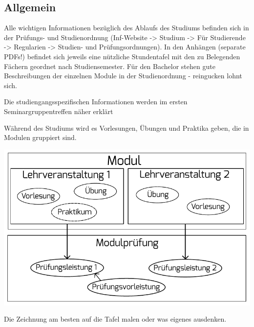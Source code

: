 \documentclass[a4paper,12pt]{report}
\begin{document}
\subsection{Allgemein}
\begin{itemize*}
	\item Alle wichtigen Informationen bezüglich des Ablaufs des Studiums befinden sich in der Prüfungs- und Studienordnung (Inf-Website -> Studium -> Für Studierende -> Regularien -> Studien- und Prüfungsordnungen).
	In den Anhängen (separate PDFs!) befindet sich jeweils eine nützliche Stundentafel mit den zu Belegenden Fächern geordnet nach Studiensemester.
	Für den Bachelor stehen gute Beschreibungen der einzelnen Module in der Studienordnung - reingucken lohnt sich.
	\item Die studiengangsspezifischen Informationen werden im ersten Seminargruppentreffen näher erklärt
	\item Während des Studiums wird es Vorlesungen, Übungen und Praktika geben, die in Modulen gruppiert sind.

  \includegraphics[width=\linewidth]{./modul.pdf}

	\begin{center}
	Die Zeichnung am besten auf die Tafel malen oder was eigenes ausdenken.
	\end{center}


\end{itemize*}
\end{document}

